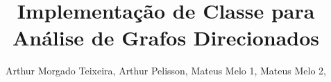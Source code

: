 \documentclass[twoside]{article}
\begin{document}
\title{Implementação de Classe para Análise de Grafos Direcionados}
\author{
	Arthur Morgado Teixeira,
	Arthur Pelisson,
	Mateus Melo 1,
	Mateus Melo 2,
}





\end{document}
